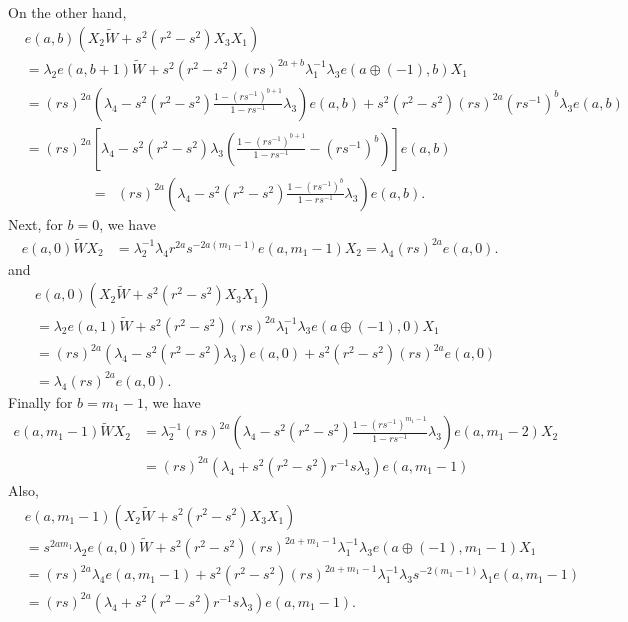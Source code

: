 \documentclass[12 pt,reqno]{amsart}
\numberwithin{equation}{section}
\theoremstyle{definition}
\theoremstyle{definition}
\theoremstyle{remark}
\theoremstyle{remark}
\begin{document}
On the other hand,
\begin{align*}
    &e(a,b)\left(X_2\tilde{W}+s^2(r^2-s^2)X_3X_1\right)\\
    &=\lambda_2e(a,b+1)\tilde{W}+s^2(r^2-s^2)(rs)^{2a+b}\lambda_1^{-1}\lambda_3e(a\oplus(-1),b)X_1\\
    &= (rs)^{2a}\left(\lambda_4-s^2(r^2-s^2)\displaystyle\frac{1-(rs^{-1})^{b+1}}{1-rs^{-1}}\lambda_3\right)e(a,b)+s^2(r^2-s^2)(rs)^{2a}(rs^{-1})^b\lambda_3e(a,b)\\
     &= (rs)^{2a}\left[\lambda_4-s^2(r^2-s^2)\lambda_3\left(\displaystyle\frac{1-(rs^{-1})^{b+1}}{1-rs^{-1}}-(rs^{-1})^b\right)\right]e(a,b)\end{align*}
    \begin{align*}
    =& (rs)^{2a}\left(\lambda_4-s^2(r^2-s^2)\displaystyle\frac{1-(rs^{-1})^b}{1-rs^{-1}}\lambda_3\right)e(a,b).
\end{align*}
Next, for $b=0$, we have 
\begin{align*}
    e(a,0)\tilde{W}X_2&=\lambda_2^{-1}\lambda_4r^{2a}s^{-2a(m_1-1)}e(a,m_1-1)X_2=\lambda_4(rs)^{2a}e(a,0).
\end{align*} and 
\begin{align*}
    &e(a,0)\left(X_2\tilde{W}+s^2(r^2-s^2)X_3X_1\right)\\
    &=\lambda_2e(a,1)\tilde{W}+s^2(r^2-s^2)(rs)^{2a}\lambda_1^{-1}\lambda_3e(a\oplus(-1),0)X_1\\
    &=(rs)^{2a}\left(\lambda_4-s^2(r^2-s^2)\lambda_3\right)e(a,0)+s^2(r^2-s^2)(rs)^{2a}e(a,0)\\
    &=\lambda_4(rs)^{2a}e(a,0).
\end{align*}
Finally for $b=m_1-1$, we have 
\begin{align*}
    e(a,m_1-1)\tilde{W}X_2&=\lambda_2^{-1}(rs)^{2a}\left(\lambda_4-s^2(r^2-s^2)\displaystyle\frac{1-(rs^{-1})^{m_1-1}}{1-rs^{-1}}\lambda_3\right)e(a,m_1-2)X_2\\
    &=(rs)^{2a}\left(\lambda_4+s^2(r^2-s^2)r^{-1}s\lambda_3\right)e(a,m_1-1)
\end{align*}
Also,
\begin{align*}
    &e(a,m_1-1)\left(X_2\tilde{W}+s^2(r^2-s^2)X_3X_1\right)\\
    &=s^{2am_1}\lambda_2e(a,0)\tilde{W}+s^2(r^2-s^2)(rs)^{2a+m_1-1}\lambda_1^{-1}\lambda_3e(a \oplus (-1),m_1-1)X_1\\
    &=(rs)^{2a}\lambda_4e(a,m_1-1)+s^2(r^2-s^2)(rs)^{2a+m_1-1}\lambda_1^{-1}\lambda_3s^{-2(m_1-1)}\lambda_1e(a,m_1-1)\\
    &=(rs)^{2a}\left(\lambda_4+s^2(r^2-s^2)r^{-1}s\lambda_3\right)e(a,m_1-1).
\end{align*}
\end{document}
